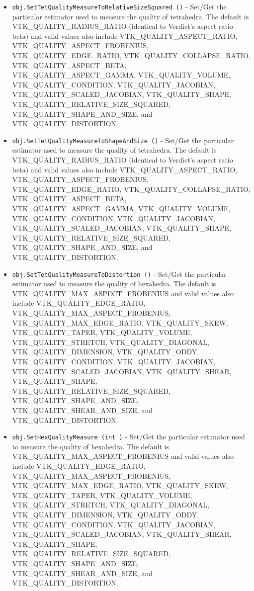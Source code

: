 \begin{itemize}
\item  \verb|obj.SetTetQualityMeasureToRelativeSizeSquared ()| -  Set/Get the particular estimator used to measure the quality of tetrahedra.
 The default is VTK\_QUALITY\_RADIUS\_RATIO (identical to Verdict's aspect
 ratio beta) and valid values also include
 VTK\_QUALITY\_ASPECT\_RATIO, VTK\_QUALITY\_ASPECT\_FROBENIUS, VTK\_QUALITY\_EDGE\_RATIO,
 VTK\_QUALITY\_COLLAPSE\_RATIO, VTK\_QUALITY\_ASPECT\_BETA, VTK\_QUALITY\_ASPECT\_GAMMA, 
 VTK\_QUALITY\_VOLUME, VTK\_QUALITY\_CONDITION, VTK\_QUALITY\_JACOBIAN, 
 VTK\_QUALITY\_SCALED\_JACOBIAN, VTK\_QUALITY\_SHAPE, VTK\_QUALITY\_RELATIVE\_SIZE\_SQUARED,
 VTK\_QUALITY\_SHAPE\_AND\_SIZE, and VTK\_QUALITY\_DISTORTION.

\item  \verb|obj.SetTetQualityMeasureToShapeAndSize ()| -  Set/Get the particular estimator used to measure the quality of tetrahedra.
 The default is VTK\_QUALITY\_RADIUS\_RATIO (identical to Verdict's aspect
 ratio beta) and valid values also include
 VTK\_QUALITY\_ASPECT\_RATIO, VTK\_QUALITY\_ASPECT\_FROBENIUS, VTK\_QUALITY\_EDGE\_RATIO,
 VTK\_QUALITY\_COLLAPSE\_RATIO, VTK\_QUALITY\_ASPECT\_BETA, VTK\_QUALITY\_ASPECT\_GAMMA, 
 VTK\_QUALITY\_VOLUME, VTK\_QUALITY\_CONDITION, VTK\_QUALITY\_JACOBIAN, 
 VTK\_QUALITY\_SCALED\_JACOBIAN, VTK\_QUALITY\_SHAPE, VTK\_QUALITY\_RELATIVE\_SIZE\_SQUARED,
 VTK\_QUALITY\_SHAPE\_AND\_SIZE, and VTK\_QUALITY\_DISTORTION.

\item  \verb|obj.SetTetQualityMeasureToDistortion ()| -  Set/Get the particular estimator used to measure the quality of hexahedra.
 The default is VTK\_QUALITY\_MAX\_ASPECT\_FROBENIUS and valid values also include
 VTK\_QUALITY\_EDGE\_RATIO, VTK\_QUALITY\_MAX\_ASPECT\_FROBENIUS, 
 VTK\_QUALITY\_MAX\_EDGE\_RATIO, VTK\_QUALITY\_SKEW, VTK\_QUALITY\_TAPER, VTK\_QUALITY\_VOLUME,
 VTK\_QUALITY\_STRETCH, VTK\_QUALITY\_DIAGONAL, VTK\_QUALITY\_DIMENSION,
 VTK\_QUALITY\_ODDY, VTK\_QUALITY\_CONDITION, VTK\_QUALITY\_JACOBIAN,
 VTK\_QUALITY\_SCALED\_JACOBIAN, VTK\_QUALITY\_SHEAR, VTK\_QUALITY\_SHAPE,
 VTK\_QUALITY\_RELATIVE\_SIZE\_SQUARED, VTK\_QUALITY\_SHAPE\_AND\_SIZE,
 VTK\_QUALITY\_SHEAR\_AND\_SIZE, and VTK\_QUALITY\_DISTORTION.

\item  \verb|obj.SetHexQualityMeasure (int )| -  Set/Get the particular estimator used to measure the quality of hexahedra.
 The default is VTK\_QUALITY\_MAX\_ASPECT\_FROBENIUS and valid values also include
 VTK\_QUALITY\_EDGE\_RATIO, VTK\_QUALITY\_MAX\_ASPECT\_FROBENIUS, 
 VTK\_QUALITY\_MAX\_EDGE\_RATIO, VTK\_QUALITY\_SKEW, VTK\_QUALITY\_TAPER, VTK\_QUALITY\_VOLUME,
 VTK\_QUALITY\_STRETCH, VTK\_QUALITY\_DIAGONAL, VTK\_QUALITY\_DIMENSION,
 VTK\_QUALITY\_ODDY, VTK\_QUALITY\_CONDITION, VTK\_QUALITY\_JACOBIAN,
 VTK\_QUALITY\_SCALED\_JACOBIAN, VTK\_QUALITY\_SHEAR, VTK\_QUALITY\_SHAPE,
 VTK\_QUALITY\_RELATIVE\_SIZE\_SQUARED, VTK\_QUALITY\_SHAPE\_AND\_SIZE,
 VTK\_QUALITY\_SHEAR\_AND\_SIZE, and VTK\_QUALITY\_DISTORTION.


\end{itemize}
